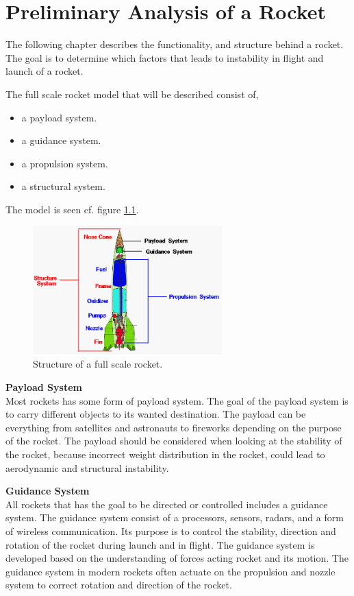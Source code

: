 \chapter{Preliminary Analysis of a Rocket}\label{sec:PRocketAnalysis}
The following chapter describes the functionality,  and structure behind a rocket. The goal is to determine which factors that leads to instability in flight and launch of a rocket. 



The full scale rocket model that will be described consist of,
\begin{itemize}[noitemsep]
\item a payload system.
\item a guidance system.
\item a propulsion system. 
\item a structural system.
\end{itemize}    
The model is seen cf. figure \ref{fig:RocketStructure}.
\begin{figure}[htbp]
	\centering
 	\includegraphics[width=0.65\textwidth]{figures/RocketStructure.png} 
 	\caption{Structure of a full scale rocket\cite{web:RocketStructure}.}
 	\label{fig:RocketStructure}
\end{figure}

\textbf{Payload System}\\
Most rockets has some form of payload system. The goal of the payload system is to carry different objects to its wanted destination. The payload can be everything from satellites and astronauts to fireworks depending on the purpose of the rocket. The payload should be considered when looking at the stability of the rocket, because incorrect weight distribution in the rocket, could lead to aerodynamic and structural instability. 


\textbf{Guidance System}\\
All rockets that has the goal to be directed or controlled includes a guidance system. The guidance system consist of a processors, sensors, radars, and  a form of wireless communication. Its purpose is to control the stability, direction and rotation of the rocket during launch and in flight. The guidance system is developed based on the understanding of forces acting rocket and its motion. The guidance system in modern rockets often actuate on the propulsion and nozzle system to correct rotation and direction of the rocket.

